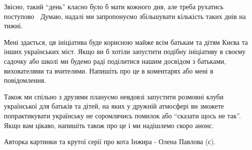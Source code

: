 Звісно, такий “день” класно було б мати кожного дня, але треба рухатись
поступово 🙂 Думаю, надалі ми запропонуємо збільшувати кількість таких днів на
тижні. 

Мені здається, ця ініціатива буде корисною майже всім батькам та дітям Києва та
інших українських міст. Якщо ви б хотіли запустити подібну ініціативу в своєму
садочку або школі ми будемо раді поділитися нашим досвідом з батьками,
вихователями та вчителями. Напишіть про це в коментарях або мені в
повідомлення.

Також ми спільно з друзями плануємо невдовзі запустити розмовні клуби
української для батьків та дітей, на яких у дружній атмосфері ви зможете
попрактикувати українську не соромлячись помилок або “сказати щось не так”.
Якщо вам цікаво, напишіть також про це і ми надішлемо скоро анонс.

Авторка картинки та крутої серії про кота Інжира - Олена Павлова (с).
